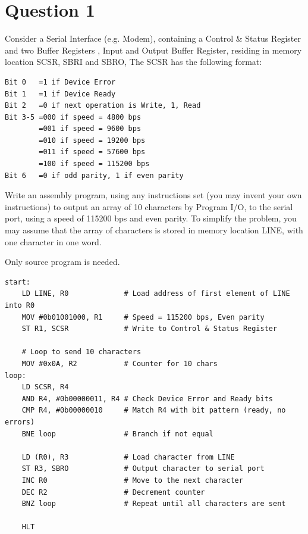 \documentclass{article}
\begin{document}
\newcommand{\documentcourse}{COMP2120}
\newcommand{\documentnumber}{5}





\section*{Question 1}
Consider a Serial Interface (e.g. Modem), containing a Control \& Status Register and two Buffer Registers , Input and Output Buffer Register, residing in memory location SCSR, SBRI and SBRO, The SCSR has the following format:
\begin{verbatim}
Bit 0   =1 if Device Error
Bit 1   =1 if Device Ready
Bit 2   =0 if next operation is Write, 1, Read
Bit 3-5 =000 if speed = 4800 bps
        =001 if speed = 9600 bps
        =010 if speed = 19200 bps
        =011 if speed = 57600 bps
        =100 if speed = 115200 bps
Bit 6   =0 if odd parity, 1 if even parity
\end{verbatim}


Write an assembly program, using any instructions set (you may invent your own instructions) to output an array of 10 characters by Program I/O, to the serial port, using a speed of 115200 bps and even parity. To simplify the problem, you may assume that the array of characters is stored in memory location LINE, with one character in one word.

Only source program is needed.

\begin{verbatim}
start:
    LD LINE, R0             # Load address of first element of LINE into R0
    MOV #0b01001000, R1     # Speed = 115200 bps, Even parity
    ST R1, SCSR             # Write to Control & Status Register

    # Loop to send 10 characters
    MOV #0x0A, R2           # Counter for 10 chars
loop:
    LD SCSR, R4 
    AND R4, #0b00000011, R4 # Check Device Error and Ready bits
    CMP R4, #0b00000010     # Match R4 with bit pattern (ready, no errors)
    BNE loop                # Branch if not equal

    LD (R0), R3             # Load character from LINE
    ST R3, SBRO             # Output character to serial port
    INC R0                  # Move to the next character
    DEC R2                  # Decrement counter
    BNZ loop                # Repeat until all characters are sent

    HLT         
\end{verbatim}
\end{document}
